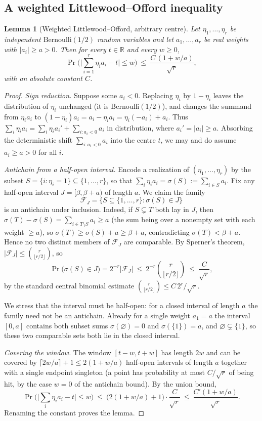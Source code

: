 \documentclass[11pt,reqno]{amsart}
\theoremstyle{plain}
\newtheorem{lemma}{Lemma}
\theoremstyle{definition}
\theoremstyle{remark}
\begin{document}
\subsection{A weighted Littlewood--Offord inequality}

\begin{lemma}[Weighted Littlewood--Offord, arbitrary centre]\label{lem:LO}
Let $\eta_1,\dots,\eta_r$ be independent $\mathrm{Bernoulli}(1/2)$ random variables and let $a_1,\dots,a_r$ be real weights with $|a_i|\ge a>0$. Then for every $t\in\mathbb{R}$ and every $w\ge0$,
\[
\Pr\Big(\Big|\sum_{i=1}^r \eta_i a_i-t\Big|\le w\Big)\ \le\ \frac{C\,(1+w/a)}{\sqrt r},
\]
with an absolute constant $C$.
\end{lemma}

\begin{proof}
\emph{Sign reduction.} Suppose some $a_i<0$. Replacing $\eta_i$ by $1-\eta_i$ leaves the distribution of $\eta_i$ unchanged (it is $\mathrm{Bernoulli}(1/2)$), and changes the summand from $\eta_i a_i$ to $(1-\eta_i)a_i=a_i-\eta_i a_i=\eta_i(-a_i)+a_i$. Thus $\sum_i\eta_i a_i=\sum_i\eta_i a_i'+ \sum_{i:a_i<0}a_i$ in distribution, where $a_i'=|a_i|\ge a$. Absorbing the deterministic shift $\sum_{i:a_i<0}a_i$ into the centre $t$, we may and do assume $a_i\ge a>0$ for all $i$.

\emph{Antichain from a half-open interval.} Encode a realization of $(\eta_1,\dots,\eta_r)$ by the subset $S=\{i:\eta_i=1\}\subseteq\{1,\dots,r\}$, so that $\sum_i\eta_i a_i=\sigma(S):=\sum_{i\in S}a_i$. Fix any half-open interval $J=[\beta,\beta+a)$ of length $a$. We claim the family
\[
\mathcal{F}_J=\{S\subseteq\{1,\dots,r\}:\sigma(S)\in J\}
\]
is an antichain under inclusion. Indeed, if $S\subsetneq T$ both lay in $J$, then $\sigma(T)-\sigma(S)=\sum_{i\in T\setminus S}a_i\ge a$ (the sum being over a nonempty set with each weight $\ge a$), so $\sigma(T)\ge\sigma(S)+a\ge\beta+a$, contradicting $\sigma(T)<\beta+a$. Hence no two distinct members of $\mathcal{F}_J$ are comparable. By Sperner's theorem, $|\mathcal{F}_J|\le\binom{r}{\lfloor r/2\rfloor}$, so
\[
\Pr\big(\sigma(S)\in J\big)=2^{-r}|\mathcal F_J|\ \le\ 2^{-r}\binom{r}{\lfloor r/2\rfloor}\ \le\ \frac{C}{\sqrt r},
\]
by the standard central binomial estimate $\binom{r}{\lfloor r/2\rfloor}\le C\,2^r/\sqrt r$.

We stress that the interval must be half-open: for a closed interval of length $a$ the family need not be an antichain. Already for a single weight $a_1=a$ the interval $[0,a]$ contains both subset sums $\sigma(\varnothing)=0$ and $\sigma(\{1\})=a$, and $\varnothing\subsetneq\{1\}$, so these two comparable sets both lie in the closed interval.

\emph{Covering the window.} The window $[t-w,t+w]$ has length $2w$ and can be covered by $\lceil 2w/a\rceil+1\le 2(1+w/a)$ half-open intervals of length $a$ together with a single endpoint singleton (a point has probability at most $C/\sqrt r$ of being hit, by the case $w=0$ of the antichain bound). By the union bound,
\[
\Pr\Big(\Big|\sum_i\eta_i a_i-t\Big|\le w\Big)\ \le\ \big(2(1+w/a)+1\big)\cdot\frac{C}{\sqrt r}\ \le\ \frac{C'(1+w/a)}{\sqrt r}.
\]
Renaming the constant proves the lemma.
\end{proof}
\end{document}

